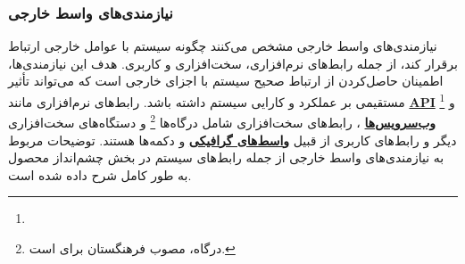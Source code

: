\documentclass[12pt,a4paper,oneside]{article}
\begin{document}
			\subsubsection{نیازمندی‌های واسط خارجی}
			نیازمندی‌های واسط خارجی مشخص می‌کنند چگونه 
			سیستم با عوامل خارجی ارتباط برقرار کند، 
			از جمله رابط‌های نرم‌افزاری، سخت‌افزاری و کاربری. 
			هدف این نیازمندی‌ها، اطمینان حاصل‌کردن از ارتباط 
			صحیح سیستم با اجزای خارجی است که می‌تواند تأثیر 
			مستقیمی بر عملکرد و کارایی سیستم داشته باشد. 
			رابط‌های نرم‌افزاری مانند 
			\hyperref[ref:api]{\textbf{API}} 
			\footnote{}
			و 
			\hyperref[ref:webserver]{\textbf{وب‌سرویس‌ها}}
			، رابط‌های 
			سخت‌افزاری شامل درگاه‌ها
			\footnote{درگاه، مصوب فرهنگستان برای  است.}
			 و دستگاه‌های سخت‌افزاری دیگر و
			 رابط‌های کاربری از قبیل 
			 \hyperref[ref:gui]{\textbf{واسط‌های گرافیکی}}
			  و دکمه‌ها هستند. توضیحات مربوط به نیازمندی‌های واسط خارجی از جمله رابط‌های سیستم 
			 در بخش چشم‌انداز محصول به طور کامل شرح داده شده است.
\end{document}
